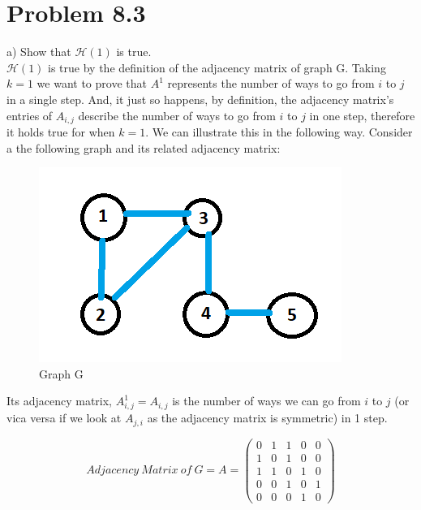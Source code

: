 \documentclass[12pt,twoside]{article}
\begin{document}
\vspace{1mm}

\newpage 


\section{Problem 8.3}

a) Show that $\mathcal{H}(1)$ is true.\\

$\mathcal{H}(1)$ is true by the definition of the adjacency matrix of graph G.  Taking $k=1$ we want to prove that $A^1$ represents the number of ways to go from $i$ to $j$ in a single step. And, it just so happens, by definition, the adjacency matrix's entries of $A_{i,j}$ describe the number of ways to go from $i$ to $j$ in one step, therefore it holds true for when $k=1$. We can illustrate this in the following way. Consider a the following graph and its related adjacency matrix:\\


\begin{figure}[h!]
    \centering
    \includegraphics[scale=1]{graph for 8.3.png}
    \caption{Graph G}
    \label{fig:my_label}
\end{figure}

Its adjacency matrix, $A_{i,j}^1=A_{i,j}$ is the number of ways we can go from $i$ to $j$ (or vica versa if we look at $A_{j,i}$ as the adjacency matrix is symmetric) in 1 step.

$$
    Adjacency \ Matrix \ of \ G = A = 
    \begin{pmatrix} 
    0 & 1 & 1 & 0 & 0 \\
    1 & 0 & 1 & 0 & 0 \\
    1 & 1 & 0 & 1 & 0 \\
    0 & 0 & 1 & 0 & 1 \\
    0 & 0 & 0 & 1 & 0 
    \end{pmatrix}
$$
\\
\end{document}

